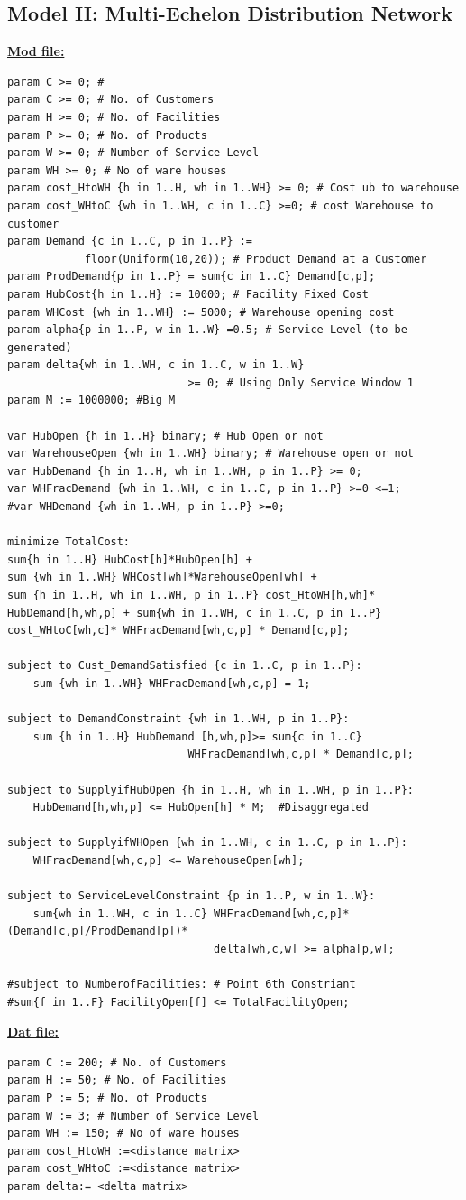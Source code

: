 \documentclass[12pt]{article}
\numberwithin{equation}{section}
\begin{document}
\subsection{Model II: Multi-Echelon Distribution Network}
\textbf{\underline{Mod file:}}
\begin{verbatim}
param C >= 0; #
param C >= 0; # No. of Customers
param H >= 0; # No. of Facilities
param P >= 0; # No. of Products
param W >= 0; # Number of Service Level
param WH >= 0; # No of ware houses
param cost_HtoWH {h in 1..H, wh in 1..WH} >= 0; # Cost ub to warehouse
param cost_WHtoC {wh in 1..WH, c in 1..C} >=0; # cost Warehouse to customer
param Demand {c in 1..C, p in 1..P} := 
            floor(Uniform(10,20)); # Product Demand at a Customer
param ProdDemand{p in 1..P} = sum{c in 1..C} Demand[c,p];
param HubCost{h in 1..H} := 10000; # Facility Fixed Cost
param WHCost {wh in 1..WH} := 5000; # Warehouse opening cost
param alpha{p in 1..P, w in 1..W} =0.5; # Service Level (to be generated)
param delta{wh in 1..WH, c in 1..C, w in 1..W} 
                            >= 0; # Using Only Service Window 1
param M := 1000000; #Big M

var HubOpen {h in 1..H} binary; # Hub Open or not
var WarehouseOpen {wh in 1..WH} binary; # Warehouse open or not
var HubDemand {h in 1..H, wh in 1..WH, p in 1..P} >= 0;
var WHFracDemand {wh in 1..WH, c in 1..C, p in 1..P} >=0 <=1;
#var WHDemand {wh in 1..WH, p in 1..P} >=0;

minimize TotalCost:
sum{h in 1..H} HubCost[h]*HubOpen[h] + 
sum {wh in 1..WH} WHCost[wh]*WarehouseOpen[wh] +
sum {h in 1..H, wh in 1..WH, p in 1..P} cost_HtoWH[h,wh]* 
HubDemand[h,wh,p] + sum{wh in 1..WH, c in 1..C, p in 1..P} 
cost_WHtoC[wh,c]* WHFracDemand[wh,c,p] * Demand[c,p];

subject to Cust_DemandSatisfied {c in 1..C, p in 1..P}:
	sum {wh in 1..WH} WHFracDemand[wh,c,p] = 1;

subject to DemandConstraint {wh in 1..WH, p in 1..P}:
	sum {h in 1..H} HubDemand [h,wh,p]>= sum{c in 1..C} 
	                        WHFracDemand[wh,c,p] * Demand[c,p];

subject to SupplyifHubOpen {h in 1..H, wh in 1..WH, p in 1..P}: 
	HubDemand[h,wh,p] <= HubOpen[h] * M;  #Disaggregated
	
subject to SupplyifWHOpen {wh in 1..WH, c in 1..C, p in 1..P}:
	WHFracDemand[wh,c,p] <= WarehouseOpen[wh];

subject to ServiceLevelConstraint {p in 1..P, w in 1..W}:
	sum{wh in 1..WH, c in 1..C} WHFracDemand[wh,c,p]*(Demand[c,p]/ProdDemand[p])*
	                            delta[wh,c,w] >= alpha[p,w];

#subject to NumberofFacilities: # Point 6th Constriant
#sum{f in 1..F} FacilityOpen[f] <= TotalFacilityOpen;
\end{verbatim}
\textbf{\underline{Dat file:}}
\begin{verbatim}
param C := 200; # No. of Customers
param H := 50; # No. of Facilities
param P := 5; # No. of Products
param W := 3; # Number of Service Level
param WH := 150; # No of ware houses
param cost_HtoWH :=<distance matrix>
param cost_WHtoC :=<distance matrix>
param delta:= <delta matrix>
\end{verbatim}
\end{document}
